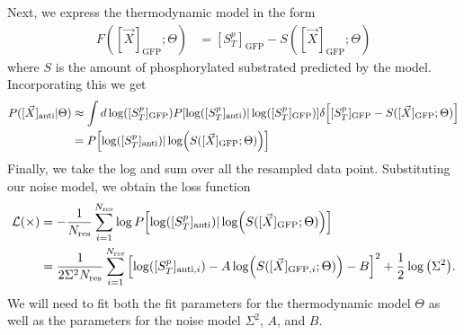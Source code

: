 \documentclass[aps,onecolumn,superscriptaddress,notitlepage]{revtex4-1}
\begin{document}
Next, we express the thermodynamic model in the form
\begin{align}
F([\vec{X}]_{\mathrm{GFP}};\Theta) &= [S_T^p]_{\mathrm{GFP}} - S([\vec{X}]_{\mathrm{GFP}};\Theta)
\end{align}
where $S$ is the amount of phosphorylated substrated predicted by the model.
Incorporating this we get
\begin{align}
P([\vec{X}]_{\mathrm{anti}} | \Theta ) &\approx   \int d\log([S_T^p]_{\mathrm{GFP}}) P\qty[\log([S_T^p]_{\mathrm{anti}}) | \log([S_T^p]_{\mathrm{GFP}})]\delta\qty[[S_T^p]_{\mathrm{GFP}} - S([\vec{X}]_{\mathrm{GFP}};\Theta)]\\
&=   P\qty[\log([S_T^p]_{\mathrm{anti}}) | \log(S([\vec{X}]_{\mathrm{GFP}};\Theta))]
\end{align} 
Finally, we take the log and sum over all the resampled data point. Substituting our noise model, we obtain the loss function
\begin{align}
\mathcal{L(\Theta)} &= -\frac{1}{N_{\mathrm{res}}}\sum_{i=1}^{N_{\mathrm{res}}}\log P\qty[\log([S_T^p]_{\mathrm{anti}}) | \log(S([\vec{X}]_{\mathrm{GFP}};\Theta))]\\
&= \frac{1}{2\Sigma^2N_{\mathrm{res}}}\sum_{i=1}^{N_{\mathrm{res}}}\qty[\log([S_T^p]_{\mathrm{anti}, i}) - A \log(S([\vec{X}]_{\mathrm{GFP}, i};\Theta)) - B]^2 + \frac{1}{2}\log\qty(\Sigma^2).
\end{align}
We will need to fit both the fit parameters for the thermodynamic model $\Theta$ as well as the parameters for the noise model $\Sigma^2$, $A$, and $B$.
\end{document}
